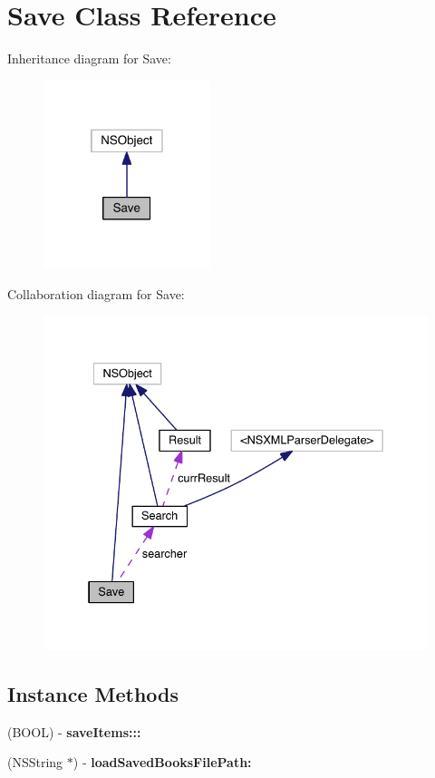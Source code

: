 \section{Save Class Reference}
\label{interface_save}


Inheritance diagram for Save\+:
\nopagebreak
\begin{figure}[H]
\begin{center}
\leavevmode
\includegraphics[width=138pt]{interface_save__inherit__graph}
\end{center}
\end{figure}


Collaboration diagram for Save\+:
\nopagebreak
\begin{figure}[H]
\begin{center}
\leavevmode
\includegraphics[width=334pt]{interface_save__coll__graph}
\end{center}
\end{figure}
\subsection*{Instance Methods}
\begin{DoxyCompactItemize}
\item 
(B\+O\+O\+L) -\/ {\bfseries save\+Items\+:::}\label{interface_save_a524d4353fa6366be4a70e2c5a1ec36ef}

\item 
(N\+S\+String $\ast$) -\/ {\bfseries load\+Saved\+Books\+File\+Path\+:}\label{interface_save_a73fcbcbfd899cca03c981caf11c4ed63}

\end{DoxyCompactItemize}
